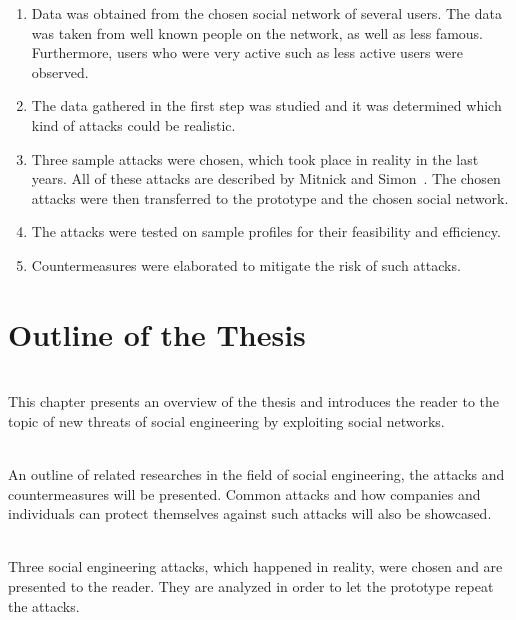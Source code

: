 \begin{enumerate}

\item Data was obtained from the chosen social network of several users. The
data was taken from well known people on the network, as well as less famous.
Furthermore, users who were very active such as less active users were
observed.

\item The data gathered in the first step was studied and it was determined
which kind of attacks could be realistic.

\item Three sample attacks were chosen, which took place in reality in the last
years. All of these attacks are described by Mitnick and
Simon~\cite{mitnick2003}. The chosen attacks were then transferred to the
prototype and the chosen social network.

\item The attacks were tested on sample profiles for their feasibility and
efficiency.

\item Countermeasures were elaborated to mitigate the risk of such attacks.

\end{enumerate}

\newpage
\section{Outline of the Thesis}

\let\oldchapterautorefname \chapterautorefname
\def\chapterautorefname{Chapter}

\vspace{0.5em}\\
\noindent This chapter presents an overview of the thesis and introduces the
reader to the topic of new threats of social engineering by exploiting social
networks.

\vspace{0.5em}\\
\noindent An outline of related researches in the field of social
engineering, the attacks and countermeasures will be presented. Common attacks
and how companies and individuals can protect themselves against such attacks
will also be showcased.

\vspace{0.5em}\\
\noindent Three social engineering attacks, which happened in reality, were chosen
and are presented to the reader. They are analyzed in order to let the
prototype repeat the attacks.


